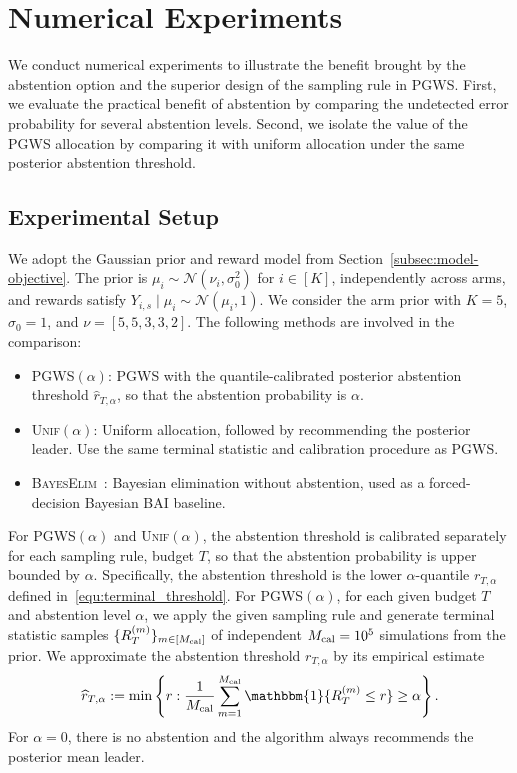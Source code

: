 \documentclass[10pt]{article}
\newcommand{\ouralg}{{\textnormal{\textsc{PGWS}}}}
\theoremstyle{plain}
\begin{document}
\section{Numerical Experiments}
\label{sec:experiments}

We conduct numerical experiments to illustrate  the benefit brought by the abstention option and the superior design of the sampling rule in \ouralg{}. 
First,
we evaluate the practical benefit of abstention by comparing the undetected error
probability for several abstention levels. Second, we isolate the value of the
\ouralg{} allocation by comparing it with uniform allocation
 under the same posterior abstention threshold. 

\subsection{Experimental Setup}
\label{subsec:experiment-setup}

We adopt the Gaussian prior and reward model from
Section~\ref{subsec:model-objective}. The prior is $\mu_i\sim \mathcal N(\nu_i,\sigma_0^2)$ for $i\in[K]$, independently across arms, and rewards satisfy $Y_{i,s}\mid \mu_i\sim \mathcal N(\mu_i,1)$. We consider the arm prior with $K=5$, $\sigma_0=1$, and $ \nu=[5,5,3,3,2]$.
% 
The following methods are involved in the comparison: 
\begin{itemize}
    \item \ouralg$(\alpha)$: \ouralg{} with the
    quantile-calibrated posterior abstention threshold $\widehat r_{T,\alpha}$, so that the abstention probability is $\alpha$.

    \item \textsc{Unif}$(\alpha)$: Uniform allocation, followed by recommending the posterior leader. Use the same terminal statistic and calibration procedure as \ouralg.

    \item \textsc{BayesElim}~\citep{atsidakou2023bayesian}: Bayesian elimination without abstention, used as a
    forced-decision Bayesian BAI baseline. 
\end{itemize}


For \ouralg$(\alpha)$ and \textsc{Unif}$(\alpha)$, the abstention threshold is
calibrated separately for each sampling rule, budget $T$, so that the abstention probability is upper bounded by $\alpha$. 
Specifically, the abstention threshold is the lower $\alpha$-quantile $r_{T,\alpha}$ defined in~\eqref{equ:terminal_threshold}.
For \ouralg{}$(\alpha)$, for each given budget $T$ and abstention level $\alpha$, we apply the given sampling rule and generate terminal statistic samples $\{R_{T}^{(m)}\}_{m\in [M_{\rm cal}]}$ of independent $M_{\rm cal}=10^5$ simulations from the prior. We approximate the abstention threshold $r_{T,\alpha}$ by its empirical estimate
\[
    \widehat r_{T,\alpha}
    :=
    \min\left\{
        r:
        \frac1{M_{\rm cal}}
        \sum_{m=1}^{M_{\rm cal}}
        \mathbbm{1}\{R_T^{(m)}\le r\}
        \ge \alpha
    \right\}.
\]
For $\alpha=0$, there is no abstention  and the algorithm always
recommends the posterior mean leader.
\end{document}
